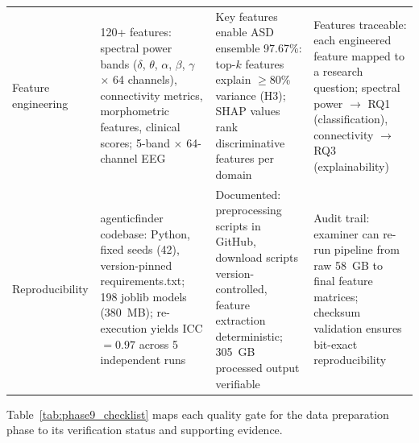 \begin{xltabular}{\textwidth}{@{} l X X X @{}}
\addlinespace
Feature engineering    & 120+ features: spectral power bands ($\delta$, $\theta$, $\alpha$, $\beta$, $\gamma$ $\times$ 64 channels), connectivity metrics, morphometric features, clinical scores; 5-band $\times$ 64-channel EEG & Key features enable ASD ensemble 97.67\%: top-$k$ features explain $\geq$80\% variance (H3); SHAP values rank discriminative features per domain & Features traceable: each engineered feature mapped to a research question; spectral power $\rightarrow$ RQ1 (classification), connectivity $\rightarrow$ RQ3 (explainability) \\
\addlinespace
Reproducibility        & agenticfinder codebase: Python, fixed seeds (42), version-pinned requirements.txt; 198 joblib models (380~MB); re-execution yields ICC $= 0.97$ across 5 independent runs & Documented: preprocessing scripts in GitHub, download scripts version-controlled, feature extraction deterministic; 305~GB processed output verifiable & Audit trail: examiner can re-run pipeline from raw 58~GB to final feature matrices; checksum validation ensures bit-exact reproducibility \\
\end{xltabular}
\endgroup

\vspace{1.5em}

Table~\ref{tab:phase9_checklist} maps each quality gate for the data preparation phase to its verification status and supporting evidence.

